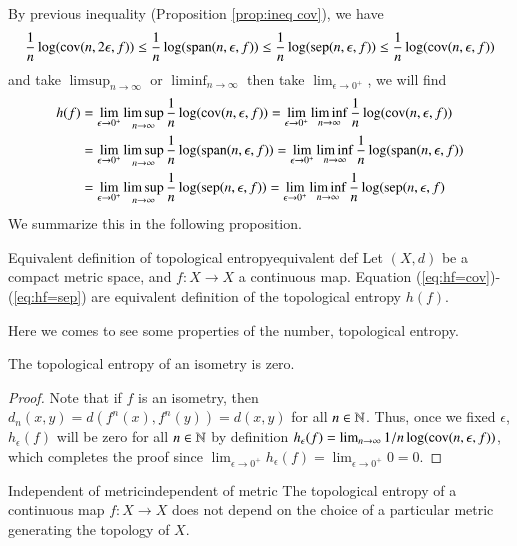 \documentclass[12pt,a4paper]{article}
\begin{document}
	By previous inequality (Proposition \ref{prop:ineq cov}), we have
	$$
	\frac{1}{n}\log(\text{cov}(n,2\epsilon,f))\leq \frac{1}{n}\log(\text{span}(n,\epsilon,f))\leq \frac{1}{n}\log(\text{sep}(n,\epsilon,f))\leq\frac{1}{n}\log(\text{cov}(n,\epsilon,f))
	$$
	and take $\limsup_{n\to \infty}$ or $\liminf_{n\to\infty}$ then take $\lim_{\epsilon\to 0^+}$, we will find
	\begin{align}
		h(f)&=\lim_{\epsilon\to 0^+} \limsup_{n\to\infty}\frac{1}{n}\log( \text{cov} (n,\epsilon,f))=\lim_{\epsilon\to 0^+} \liminf_{n\to\infty}\frac{1}{n}\log( \text{cov} (n,\epsilon,f)) \label{eq:hf=cov}\\   
		&=\lim_{\epsilon\to 0^+} \limsup_{n\to\infty}\frac{1}{n}\log(\text{span}(n,\epsilon,f))=\lim_{\epsilon\to 0^+} \liminf_{n\to\infty}\frac{1}{n}\log( \text{span} (n,\epsilon,f)) \label{eq:hf=spn}\\ 
		&=\lim_{\epsilon\to 0^+} \limsup_{n\to\infty}\frac{1}{n}\log(\text{sep}(n,\epsilon,f))=\lim_{\epsilon\to 0^+} \liminf_{n\to\infty}\frac{1}{n}\log( \text{sep} (n,\epsilon,f)\label{eq:hf=sep}
	\end{align}
	We summarize this in the following proposition.
	\begin{lemma}{Equivalent definition of topological entropy}{equivalent def}
		Let $(X,d)$ be a compact metric space, and $f:X\rightarrow X$ a continuous map. Equation (\ref{eq:hf=cov})-(\ref{eq:hf=sep}) are equivalent definition of the topological entropy $h(f)$.
	\end{lemma}
	Here we comes to see some properties of the number, topological entropy.
	\begin{proposition}{}{}
		The topological entropy of an isometry is zero.
	\end{proposition}
	\begin{proof}
		Note that if $f$ is an isometry, then $d_n(x,y)=d(f^n(x),f^n(y))=d(x,y)$ for all $n\in \mathbb{N}$. Thus, once we fixed $\epsilon$, $h_{\epsilon}(f)$ will be zero for all $n\in \mathbb{N}$ by definition $h_\epsilon(f) = \lim_{n\to \infty} 1/n \log (\text{cov}(n,\epsilon,f))$, which completes the proof since $\lim_{\epsilon\to 0^+} h_\epsilon(f) = \lim_{\epsilon\to 0^+} 0=0$. 
	\end{proof}
	\begin{lemma}{Independent of metric}{independent of metric}
		The topological entropy of a continuous map $f:X\rightarrow X$ does not depend on the choice of a particular metric generating the topology of $X$.
	\end{lemma}
\end{document}
